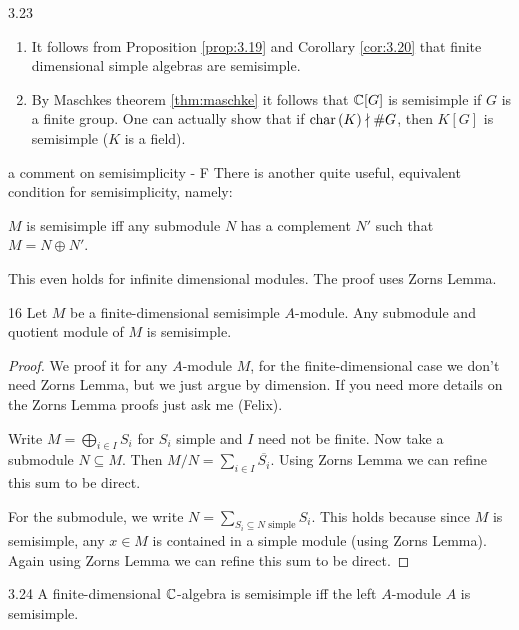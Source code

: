 \documentclass[twoside = false,	%
		headsepline,		%
		parskip = true,
		]{scrbook}						%
\begin{document}
    \begin{example}{}{3.23}
        \begin{enumerate}
            \item It follows from Proposition \ref{prop:3.19} and Corollary \ref{cor:3.20} that finite dimensional simple algebras are semisimple.
            \item By Maschkes theorem \ref{thm:maschke} it follows that $\mathbb C[G]$ is semisimple if $G$ is a finite group. One can actually show that if $\mathrm{char} \,(K) \nmid \#G$, then $K[G]$ is semisimple ($K$ is a field).
        \end{enumerate}
    \end{example}

    \begin{remark*}{a comment on semisimplicity - F}
        There is another quite useful, equivalent condition for semisimplicity, namely:

        $M$ is semisimple iff any submodule $N$ has a complement $N'$ such that $M = N \oplus N'$.
        
        This even holds for infinite dimensional modules. The proof uses Zorns Lemma.
    \end{remark*}
    
    \begin{exercise}{}{16}
        Let $M$ be a finite-dimensional semisimple $A$-module. Any submodule and quotient module of $M$ is semisimple.
    \end{exercise}
    \begin{proof}
        We proof it for any $A$-module $M$, for the finite-dimensional case we don't need Zorns Lemma, but we just argue by dimension. If you need more details on the Zorns Lemma proofs just ask me (Felix).
        
        Write $M = \bigoplus_{i \in I}S_i$ for $S_i$ simple and $I$ need not be finite. Now take a submodule $N \subseteq M$. Then $M/N = \sum_{i \in I} \overline{S_i}$. Using Zorns Lemma we can refine this sum to be direct.

        For the submodule, we write $N = \sum\limits_{S_i \subseteq N \text{ simple}} S_i$. This holds because since $M$ is semisimple, any $x \in M$ is contained in a simple module (using Zorns Lemma). Again using Zorns Lemma we can refine this sum to be direct.
    \end{proof}

    \begin{proposition}{}{3.24}
        A finite-dimensional $\mathbb C$-algebra is semisimple iff the left $A$-module $A$ is semisimple.
    \end{proposition}
\end{document}
